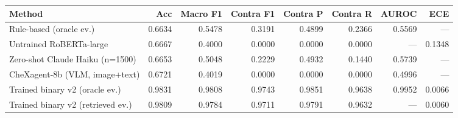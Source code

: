 \begin{tabular}{lrrrrrrr}
\toprule
Method & Acc & Macro F1 & Contra F1 & Contra P & Contra R & AUROC & ECE \\
\midrule
Rule-based (oracle ev.) & 0.6634 & 0.5478 & 0.3191 & 0.4899 & 0.2366 & 0.5569 & --- \\
Untrained RoBERTa-large & 0.6667 & 0.4000 & 0.0000 & 0.0000 & 0.0000 & --- & 0.1348 \\
Zero-shot Claude Haiku (n=1500) & 0.6653 & 0.5048 & 0.2229 & 0.4932 & 0.1440 & 0.5739 & --- \\
CheXagent-8b (VLM, image+text) & 0.6721 & 0.4019 & 0.0000 & 0.0000 & 0.0000 & 0.4996 & --- \\
Trained binary v2 (oracle ev.) & 0.9831 & 0.9808 & 0.9743 & 0.9851 & 0.9638 & 0.9952 & 0.0066 \\
Trained binary v2 (retrieved ev.) & 0.9809 & 0.9784 & 0.9711 & 0.9791 & 0.9632 & --- & 0.0060 \\
\bottomrule
\end{tabular}